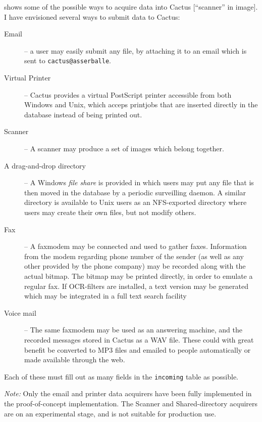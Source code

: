  shows some of the possible ways to acquire
data into Cactus [\textsf{``scanner'' in image}].  I have envisioned
several ways to submit data to Cactus:

\begin{description}
\item[Email] -- a user may easily submit any file, by
  attaching it to an email which is sent to
  \texttt{cactus@asserballe}. 

\item[Virtual Printer] -- Cactus provides a virtual
  PostScript printer accessible from both Windows and Unix,
  which acceps printjobs that are inserted directly in the
  database instead of being printed out.

\item[Scanner] -- A scanner may produce a set of images
  which belong together.  

\item[A drag-and-drop directory] -- A Windows \textit{file share} is provided
in which users may put any file that is then moved in the database by a
periodic surveilling daemon.  A similar directory is available to Unix users as
an NFS-exported directory where users may create their own files, but not
modify others.  


\item[Fax] -- A faxmodem may be connected and used to gather
  faxes.  Information from the modem regarding phone number
  of the sender (as well as any other provided by the phone
  company) may be recorded along with the actual bitmap.
  The bitmap may be printed directly, in order to emulate a
  regular fax.  If OCR-filters are installed, a text
  version may be generated which may be integrated in a full
  text search facility
  
\item[Voice mail] -- The same faxmodem may be used as an
  answering machine, and the recorded messages stored in
  Cactus as a WAV file.  These could with great benefit be
  converted to MP3 files and emailed to people automatically or made available through the web. 

\end{description}

Each of these must fill out as many fields in the
\texttt{incoming} table as possible.  

\textit{Note:} Only the email and printer data acquirers have been fully
implemented in the proof-of-concept implementation.  The Scanner and
Shared-directory acquirers are on an experimental stage, and is not suitable
for production use.


